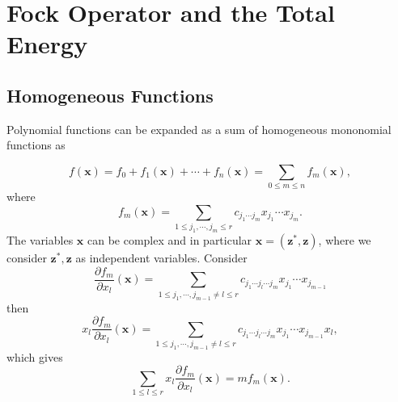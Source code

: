 \documentclass[aps,preprint]{revtex4}%
\begin{document}
\section{Fock Operator and the Total Energy\label{Fock&Energy}}

\subsection{Homogeneous Functions\label{HomFunc}}

Polynomial functions can be expanded as a sum of homogeneous mononomial
functions as%

\begin{equation}
f\left(  \bm{x}\right)  =f_{0}+f_{1}\left(  \bm{x}\right)  +\cdots
+f_{n}\left(  \bm{x}\right)  =%
{\textstyle\sum\limits_{0\leq m\leq n}}
f_{m}\left(  \bm{x}\right)  ,
\end{equation}
where
\begin{equation}
f_{m}\left(  \bm{x}\right)  =%
{\textstyle\sum\limits_{1\leq j_{1},\cdots,j_{m}\leq r}}
c_{j_{1}\cdots j_{m}}x_{j_{1}}\cdots x_{j_{m}}.
\end{equation}
The variables $\bm{x}$ can be complex and in particular $\bm{x=}\left(
\bm{z}^{\ast}\bm{,z}\right)  $, where we consider $\bm{z}^{\ast}\bm{,z}$ as
independent variables. Consider
\begin{equation}
\frac{\partial f_{m}}{\partial x_{l}}\left(  \bm{x}\right)  =%
{\textstyle\sum\limits_{1\leq j_{1},\cdots,j_{m-1}\neq l\leq r}}
c_{j_{1}\cdots j_{l}\cdots j_{m}}x_{j_{1}}\cdots x_{j_{m-1}}%
\end{equation}
then
\begin{equation}
x_{l}\frac{\partial f_{m}}{\partial x_{l}}\left(  \bm{x}\right)  =%
{\textstyle\sum\limits_{1\leq j_{1},\cdots,j_{m-1}\neq l\leq r}}
c_{j_{1}\cdots j_{l}\cdots j_{m}}x_{j_{1}}\cdots x_{j_{m-1}}x_{l},
\end{equation}
which gives
\begin{equation}%
{\textstyle\sum\limits_{1\leq l\leq r}}
x_{l}\frac{\partial f_{m}}{\partial x_{l}}\left(  \bm{x}\right)
=mf_{m}\left(  \bm{x}\right)  .
\end{equation}
\end{document}
